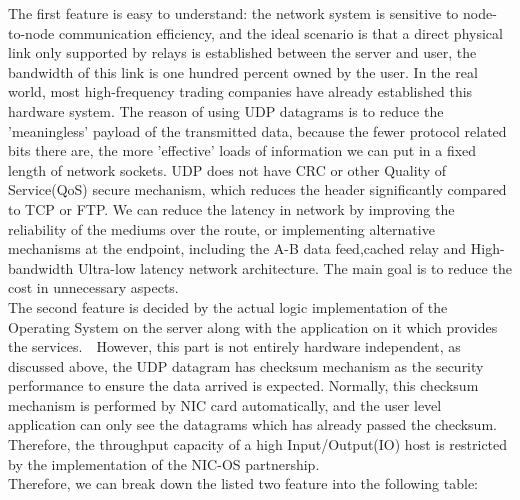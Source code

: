 \documentclass[11pt,openright,a4paper]{report}
\begin{document}
The first feature is easy to understand: the network system is sensitive to node-to-node communication efficiency, and the ideal scenario is that a direct physical link only supported by relays is established between the server and user, the bandwidth of this link is one hundred percent owned by the user. In the real world, most high-frequency trading companies have already established this hardware system\cite{budish2015high}. The reason of using UDP datagrams is to reduce the 'meaningless' payload of the transmitted data, because the fewer protocol related bits there are, the more 'effective' loads of information we can put in a fixed length of network sockets. UDP does not have CRC or other Quality of Service(QoS) secure mechanism, which reduces the header significantly compared to TCP or FTP\cite{jacobson1992tcp}. We can reduce the latency in network by improving the reliability of the mediums over the route, or implementing alternative mechanisms at the endpoint, including the A-B data feed,cached relay and High-bandwidth Ultra-low latency network architecture\cite{alizadeh2012less}. The main goal is to reduce the cost in unnecessary aspects.\\
The second feature is decided by the actual logic implementation of the Operating System on the server along with the application on it which provides the services.　However, this part is not entirely hardware independent,  as discussed above, the UDP datagram has checksum mechanism as the security performance to ensure the data arrived is expected. Normally, this checksum mechanism is performed by NIC card automatically, and the user level application can only see the datagrams which has already passed the checksum. Therefore, the throughput capacity of a high Input/Output(IO) host is restricted by the implementation of the NIC-OS partnership\cite{livny1997mechanisms}. \\
Therefore, we can break down the listed two feature into the following table:
\end{document}
